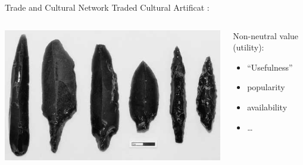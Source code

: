 \documentclass[12pt, handout=show,notes=show]{beamer}
\begin{document}
\begin{frame}{Trade and Cultural Network}
    Traded Cultural Artificat : 
    \begin{columns}
	\begin{column}{.5\textwidth}
	    \includegraphics[width=\textwidth]{images/obsidianFlint.jpg}	
	\end{column}
	\begin{column}{.4\textwidth}
	    \small
	    Non-neutral value (utility): 
	    \begin{itemize}
		\item ``Usefulness''
		\item popularity
		\item availability
		\item \dots
	    \end{itemize}
	\end{column}
    \end{columns}
\end{frame}
\end{document}
